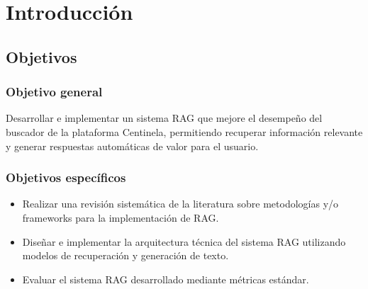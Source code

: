 \chapter{Introducción}
\section{Objetivos}
\subsection{Objetivo general}
Desarrollar e implementar un sistema RAG que mejore el desempeño del buscador de la plataforma Centinela, permitiendo recuperar información relevante y generar respuestas automáticas de valor para el usuario.
\subsection{Objetivos específicos}
\begin{itemize}[align=left, label=--]
    \item Realizar una revisión sistemática de la literatura sobre metodologías y/o frameworks para la implementación de RAG.
    \item Diseñar e implementar la arquitectura técnica del sistema RAG utilizando modelos de recuperación y generación de texto.
    \item Evaluar el sistema RAG desarrollado mediante métricas estándar.
\end{itemize}
